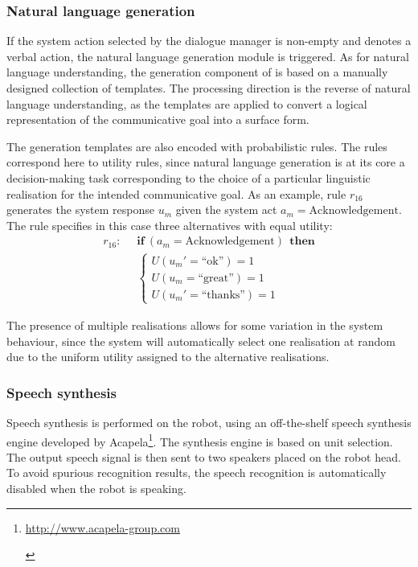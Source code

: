 \subsubsection*{Natural language generation}

If the system action selected by the dialogue manager is non-empty and denotes a verbal action, the natural language generation module is triggered.  As for natural language understanding, the generation component of \opendial{} is based on a manually designed collection of templates.  The processing direction is the reverse of natural language understanding, as the templates are applied to convert a logical representation of the communicative goal into a surface form. 

The generation templates are also encoded with probabilistic rules.  The rules correspond here to utility rules, since natural language generation is at its core a decision-making task corresponding to the choice of a particular linguistic realisation for the intended communicative goal.  As an example, rule $r_{16}$ generates the system response $u_m$ given the system act $a_m=\mathrm{Acknowledgement}$.  The rule specifies in this case three alternatives with equal utility:
\begin{align*}
r_{16}: &\;\;\textbf{if} \ (a_m = \mathrm{Acknowledgement} )  \ \ \textbf{then} \\ 
& \;\; \begin{cases} U(u_m'=\text{``ok''}) = 1 \\ U(u_m=\text{``great''}) = 1 \\ U(u_m'=\text{``thanks''}) = 1 \end{cases}
\end{align*}

The presence of multiple realisations allows for some variation in the system behaviour, since the system will automatically select one realisation at random due to the uniform utility assigned to the alternative realisations.

\subsubsection*{Speech synthesis}

Speech synthesis is performed on the robot, using an off-the-shelf speech synthesis engine developed by Acapela\footnote{\begin{scriptsize}\url{http://www.acapela-group.com}\end{scriptsize}}. The synthesis engine is based on unit selection. The output speech signal is then sent to two speakers placed on the robot head. To avoid spurious recognition results, the speech recognition is automatically disabled when the robot is speaking.  
 
